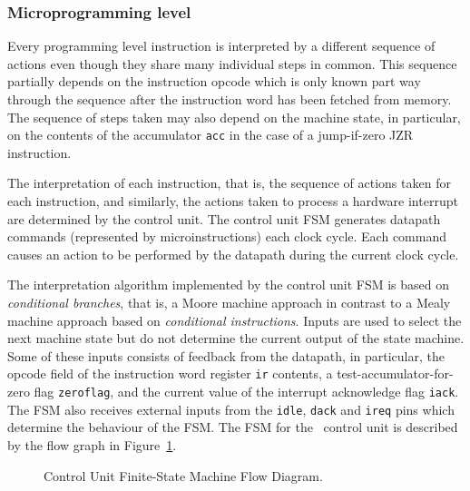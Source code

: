 \subsubsection{Microprogramming level}
\label{sec-micro}

Every programming level instruction is interpreted by a different
sequence of actions even though
they share many individual steps in common.
This sequence partially depends on the instruction opcode which
is only known part way through the sequence after the instruction word
has been fetched from memory.
The sequence of steps taken may also depend on
the machine state, in particular, on the contents of the
accumulator \verb"acc"
in the case of a jump-if-zero JZR instruction.

The interpretation of each instruction, that is,
the sequence of actions taken for each instruction, and similarly,
the actions taken to process a hardware interrupt are determined
by the control unit.
The control unit FSM generates
datapath commands (represented by microinstructions)
each clock cycle.
Each command causes an action to be performed by the datapath during
the current clock cycle.

The interpretation algorithm implemented by the control unit FSM is
based on {\it conditional branches}, that is,
a Moore machine approach in contrast to a Mealy machine approach
based on {\it conditional instructions}.
Inputs are used to select the next machine state but do not
determine the current output of the state machine.
Some of these inputs consists of
feedback from the datapath, in particular,
the opcode field of the instruction
word register \verb"ir" contents,
a \mbox{test-accumulator-for-zero} flag \verb"zeroflag",
and the current value of the interrupt acknowledge flag \verb"iack".
The FSM also receives external inputs from the \verb"idle",
\verb"dack" and \verb"ireq" pins which determine the behaviour of the FSM.
The FSM for the \Tamarack\ control
unit is described by the flow graph in Figure~\ref{fig-flow}.

\begin{figure}
\begin{center}


\caption{Control Unit Finite-State Machine Flow Diagram.}
\label{fig-flow}
\end{center}
\end{figure}

